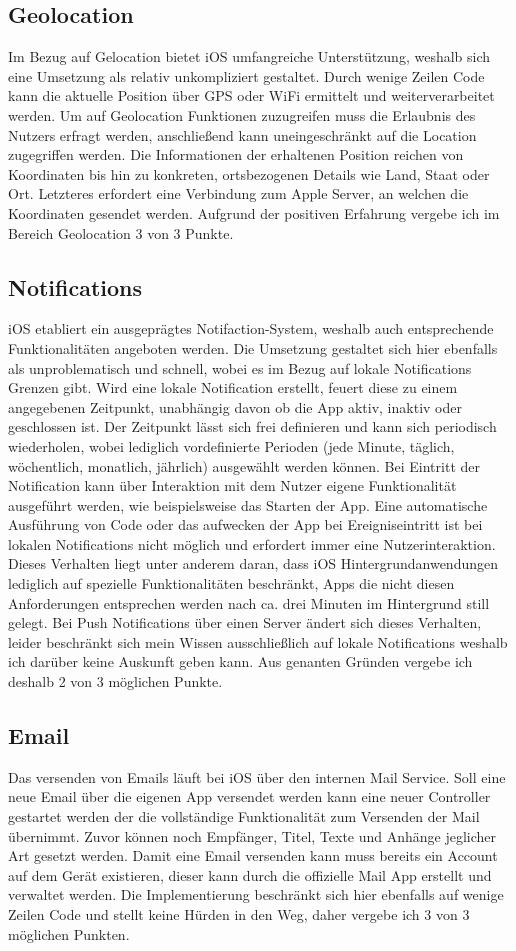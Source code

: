 \subsection{Geolocation}
Im Bezug auf Gelocation bietet iOS umfangreiche Unterstützung, weshalb sich eine Umsetzung als relativ unkompliziert gestaltet. Durch wenige Zeilen Code kann die aktuelle Position über GPS oder WiFi ermittelt und weiterverarbeitet werden. Um auf Geolocation Funktionen zuzugreifen muss die Erlaubnis des Nutzers erfragt werden, anschließend kann uneingeschränkt auf die Location zugegriffen werden. Die Informationen der erhaltenen Position reichen von Koordinaten bis hin zu konkreten, ortsbezogenen Details wie Land, Staat oder Ort. Letzteres erfordert eine Verbindung zum Apple Server, an welchen die Koordinaten gesendet werden. Aufgrund der positiven Erfahrung vergebe ich im Bereich Geolocation 3 von 3 Punkte.
\subsection{Notifications}
iOS etabliert ein ausgeprägtes Notifaction-System, weshalb auch entsprechende Funktionalitäten angeboten werden. Die Umsetzung gestaltet sich hier ebenfalls als unproblematisch und schnell, wobei es im Bezug auf lokale Notifications Grenzen gibt. Wird eine lokale Notification erstellt, feuert diese zu einem angegebenen Zeitpunkt, unabhängig davon ob die App aktiv, inaktiv oder geschlossen ist. Der Zeitpunkt lässt sich frei definieren und kann sich periodisch wiederholen, wobei lediglich vordefinierte Perioden (jede Minute, täglich, wöchentlich, monatlich, jährlich) ausgewählt werden können. Bei Eintritt der Notification kann über Interaktion mit dem Nutzer eigene Funktionalität ausgeführt werden, wie beispielsweise das Starten der App. Eine automatische Ausführung von Code oder das aufwecken der App bei Ereigniseintritt ist bei lokalen Notifications nicht möglich und erfordert immer eine Nutzerinteraktion.
Dieses Verhalten liegt unter anderem daran, dass iOS Hintergrundanwendungen lediglich auf spezielle Funktionalitäten beschränkt, Apps die nicht diesen Anforderungen entsprechen werden nach ca. drei Minuten im Hintergrund still gelegt.
Bei Push Notifications über einen Server ändert sich dieses Verhalten, leider beschränkt sich mein Wissen ausschließlich auf lokale Notifications weshalb ich darüber keine Auskunft geben kann. Aus genanten Gründen vergebe ich deshalb 2 von 3 möglichen Punkte.
\subsection{Email}
Das versenden von Emails läuft bei iOS über den internen Mail Service. Soll eine neue Email über die eigenen App versendet werden kann eine neuer Controller gestartet werden der die vollständige Funktionalität zum Versenden der Mail übernimmt. Zuvor können noch Empfänger, Titel, Texte und Anhänge jeglicher Art gesetzt werden. Damit eine Email versenden kann muss bereits ein Account auf dem Gerät existieren, dieser kann durch die offizielle Mail App erstellt und verwaltet werden. Die Implementierung beschränkt sich hier ebenfalls auf wenige Zeilen Code und stellt keine Hürden in den Weg, daher vergebe ich 3 von 3 möglichen Punkten.
